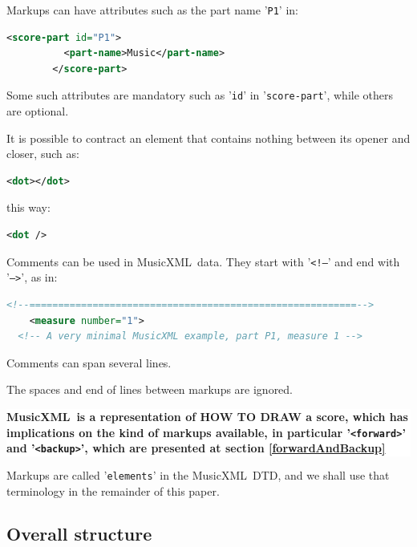 \documentclass[12pt,a4paper]{article}
\newcommand{\mxml}{MusicXML}
\newcommand{\hand}[1]{
  \makebox[0pt][r]{
  	\textcolor{bordeaux}{\raisebox{-.5ex}{\pnt\symbol{'345}}}\hspace{1em}
	}%
	\hfill%
	{%
	  \setlength{\fboxsep}{2ex}%
	  \colorbox{white}{
	  	\parbox{.8\textwidth}{\textcolor{bordeaux}{\textbf{#1}}}
	  }
		\hfill
	}
}
\begin{document}
Markups can have attributes such as the part name '{\tt P1}' in:
\begin{lstlisting}[language=XML]
        <score-part id="P1">
          <part-name>Music</part-name>
        </score-part>
\end{lstlisting}
Some such attributes are mandatory such as {'\tt id}' in {'\tt score-part}', while others are optional.

It is possible to contract an element that contains nothing between its opener and closer, such as:
\begin{lstlisting}[language=XML]
        <dot></dot>
\end{lstlisting}
this way:
\begin{lstlisting}[language=XML]
        <dot />
\end{lstlisting}

Comments can be used in \mxml\ data. They start with {'\tt <!--}' and end with {'\tt -->}', as in:
\begin{lstlisting}[language=XML]
<!--=========================================================-->
    <measure number="1">
  <!-- A very minimal MusicXML example, part P1, measure 1 -->
\end{lstlisting}

Comments can span several lines.

The spaces and end of lines between markups are ignored.

\hand {\mxml\ is a representation of HOW TO DRAW a score, which has implications on the kind of markups available, in particular {'\tt <forward>}' and {'\tt <backup>}', which are presented at section \ref{forwardAndBackup} %
}

Markups are called {'\tt elements}' in the \mxml\ DTD, and we shall use that terminology in the remainder of this paper.

\subsection{Overall structure}
\end{document}

